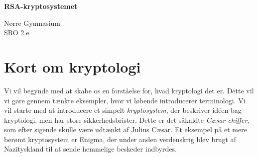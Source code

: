 \documentclass[12pt]{article}
\begin{document}
\begin{titlepage}
\begin{center}
    \Large
    \textbf{RSA-kryptosystemet}
        
    \vspace{0.4cm}
    \large
     Nørre Gymnasium\\
     SRO 2.e
        

\end{center}
\end{titlepage}






\section{Kort om kryptologi}


Vi vil begynde med at skabe os en forståelse for, hvad kryptologi det er. Dette vil vi gøre gennem tænkte eksempler, hvor vi løbende introducerer terminologi. Vi vil starte med at introducere et simpelt \textit{kryptosystem}, der beskriver idéen bag kryptologi, men har store sikkerhedsbrister. Dette er det såkaldte \textit{Cæsar-chiffer}, som efter sigende skulle være udtænkt af Julius Cæsar. Et eksempel på et mere berømt kryptosystem er Enigma, der under anden verdenskrig blev brugt af Nazityskland til at sende hemmelige beskeder indbyrdes. 
\end{document}
